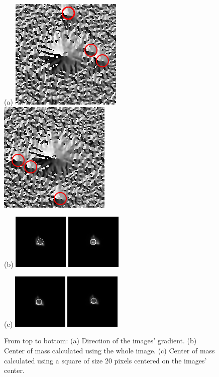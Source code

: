 \documentclass{aa}
\begin{document}
\begin{figure}
\centering

(a) \includegraphics[width=.2\textwidth]{gradient_angle_img_0.png}
\includegraphics[width=.2\textwidth]{gradient_angle_img_45.png}

(b) \includegraphics[width=.2\textwidth]{cm_r_100_img_0.png}
\includegraphics[width=.2\textwidth]{cm_r_100_img_45.png}

(c) \includegraphics[width=.2\textwidth]{cm_r_20_img_0.png}
\includegraphics[width=.2\textwidth]{cm_r_20_img_45.png}
\caption{From top to bottom: (a) Direction of the images' gradient.
							  (b) Center of mass calculated using the whole image.
							  (c) Center of mass calculated using a square of size 20 pixels 									 centered on the images' center.}
\label{fig:gradient_cm}
\end{figure}
\end{document}
